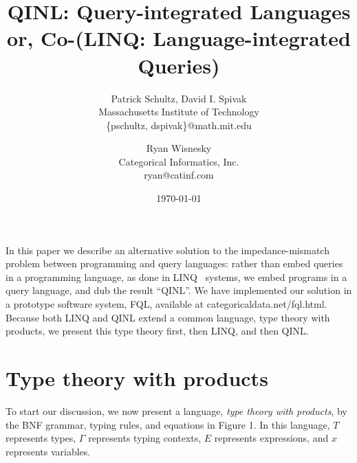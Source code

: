 \documentclass[11pt]{article}
\theoremstyle{remark}
\theoremstyle{definition}
\begin{document}
\title{QINL: Query-integrated Languages \\
{\large or, Co-(LINQ: Language-integrated Queries)}}
\author{Patrick Schultz, David I. Spivak
\\ Massachusetts Institute of Technology \\ {\sf \{pschultz, dspivak\}@math.mit.edu} 
\and
Ryan Wisnesky
\\
Categorical Informatics, Inc.
 \\ {\sf ryan@catinf.com}
}

\date{\today}

\maketitle




\vspace*{-.2in}
In this paper we describe an alternative solution to the impedance-mismatch problem between programming and query languages: rather than embed queries in a programming language, as done in LINQ~\cite{Tannen:1992:NEQ:645500.655920} systems, we embed programs  in a query language, and dub the result ``QINL''.  We have implemented our solution in a prototype software system, FQL, available at {\sf categoricaldata.net/fql.html}.  Because both LINQ and QINL extend a common language, type theory with products, we present this type theory first, then LINQ, and then QINL.

\section{Type theory with products}

To start our discussion, we now present a language, {\it type theory with products}, by the BNF grammar, typing rules, and equations in Figure 1.  In this language, $T$ represents types, $\Gamma$ represents typing contexts, $E$ represents expressions, and $x$ represents variables.  
\end{document}
